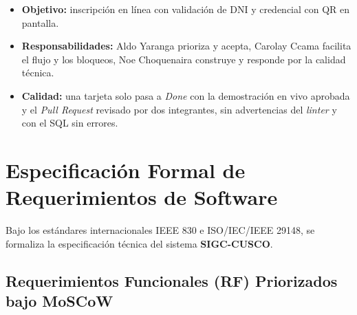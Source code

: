 \documentclass[11pt,a4paper]{article}
\begin{document}
\begin{tcolorbox}[colback=green!4!white, colframe=green!50!black, title=\textbf{Entregable del Ejercicio 2: Objetivo, Responsabilidades y Calidad}, arc=1.5mm]
\begin{itemize}\setlength\itemsep{0.15em}
    \item \textbf{Objetivo:} inscripción en línea con validación de DNI y credencial con QR en pantalla.
    \item \textbf{Responsabilidades:} Aldo Yaranga prioriza y acepta, Carolay Ccama facilita el flujo y los bloqueos, Noe Choquenaira construye y responde por la calidad técnica.
    \item \textbf{Calidad:} una tarjeta solo pasa a \textit{Done} con la demostración en vivo aprobada y el \textit{Pull Request} revisado por dos integrantes, sin advertencias del \textit{linter} y con el SQL sin errores.
\end{itemize}
\end{tcolorbox}

\section{Especificación Formal de Requerimientos de Software}

Bajo los estándares internacionales IEEE 830 e ISO/IEC/IEEE 29148, se formaliza la especificación técnica del sistema \textbf{SIGC-CUSCO}.

\subsection{Requerimientos Funcionales (RF) Priorizados bajo MoSCoW}
\end{document}
